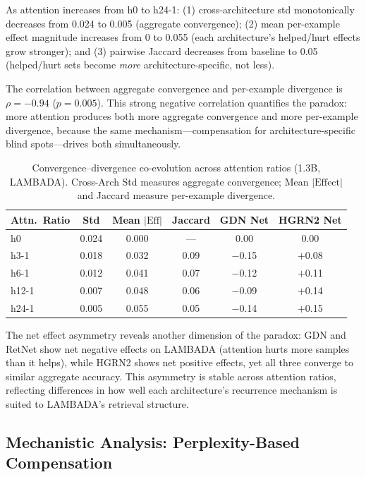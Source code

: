 \documentclass[11pt,a4paper]{article}
\begin{document}
As attention increases from h0 to h24-1: (1) cross-architecture std monotonically decreases from 0.024 to 0.005 (aggregate convergence); (2) mean per-example effect magnitude increases from 0 to 0.055 (each architecture's helped/hurt effects grow stronger); and (3) pairwise Jaccard decreases from baseline to 0.05 (helped/hurt sets become \emph{more} architecture-specific, not less).

The correlation between aggregate convergence and per-example divergence is $\rho{=}{-}0.94$ ($p{=}0.005$).
This strong negative correlation quantifies the paradox: more attention produces both more aggregate convergence and more per-example divergence, because the same mechanism---compensation for architecture-specific blind spots---drives both simultaneously.

\begin{table}[t]
\centering
\small
\caption{Convergence--divergence co-evolution across attention ratios (1.3B, LAMBADA). Cross-Arch Std measures aggregate convergence; Mean $|\text{Effect}|$ and Jaccard measure per-example divergence.}
\label{tab:bridge}
\begin{tabular}{lccccc}
\toprule
\textbf{Attn.\ Ratio} & \textbf{Std} & \textbf{Mean $|\text{Eff}|$} & \textbf{Jaccard} & \textbf{GDN Net} & \textbf{HGRN2 Net} \\
\midrule
h0    & 0.024 & 0.000 & ---  & 0.00  & 0.00 \\
h3-1  & 0.018 & 0.032 & 0.09 & $-$0.15 & $+$0.08 \\
h6-1  & 0.012 & 0.041 & 0.07 & $-$0.12 & $+$0.11 \\
h12-1 & 0.007 & 0.048 & 0.06 & $-$0.09 & $+$0.14 \\
h24-1 & 0.005 & 0.055 & 0.05 & $-$0.14 & $+$0.15 \\
\bottomrule
\end{tabular}
\end{table}

The net effect asymmetry reveals another dimension of the paradox: GDN and RetNet show net negative effects on LAMBADA (attention hurts more samples than it helps), while HGRN2 shows net positive effects, yet all three converge to similar aggregate accuracy.
This asymmetry is stable across attention ratios, reflecting differences in how well each architecture's recurrence mechanism is suited to LAMBADA's retrieval structure.


\subsection{Mechanistic Analysis: Perplexity-Based Compensation}
\label{sec:mechanism}
\end{document}
